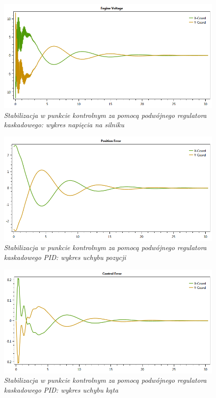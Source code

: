\documentclass[12pt, oneside]{report}
\theoremstyle{definition}
\begin{document}
\begin{figure}[H]
	\centering
		\includegraphics[width = 350pt]{LineCasPIDEV} 
		\caption{\textit{Stabilizacja w punkcie kontrolnym za pomocą podwójnego regulatora kaskadowego: wykres napięcia na silniku}}
		\label{plot:LineCasPIDEV}
\end{figure}

\begin{figure}[H]
	\centering
		\includegraphics[width = 350pt]{LineCasPIDCEP} 
		\caption{\textit{Stabilizacja w punkcie kontrolnym za pomocą podwójnego regulatora kaskadowego PID: wykres uchybu pozycji}}
		\label{plot:LineCasPIDCEP}
\end{figure}

\begin{figure}[H]
	\centering
		\includegraphics[width = 350pt]{LineCasPIDCEA} 
		\caption{\textit{Stabilizacja w punkcie kontrolnym za pomocą podwójnego regulatora kaskadowego PID: wykres uchybu kąta}}
		\label{plot:LineCasPIDCEA}
\end{figure}
\end{document}
